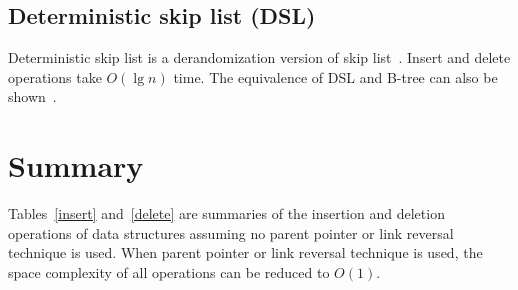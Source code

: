 \subsection{Deterministic skip list (DSL)}
Deterministic skip list is a derandomization version of skip list~\cite{Munro1992}. Insert and delete operations take $O(\lg n)$ time. The equivalence of DSL and B-tree can also be shown~\cite{Lamoureux1996}.

\section{Summary}
Tables~\ref{insert} and~\ref{delete} are summaries of the insertion and deletion operations of data structures assuming no parent pointer or link reversal technique is used. When parent pointer or link reversal technique is used, the space complexity of all operations can be reduced to $O(1)$.

